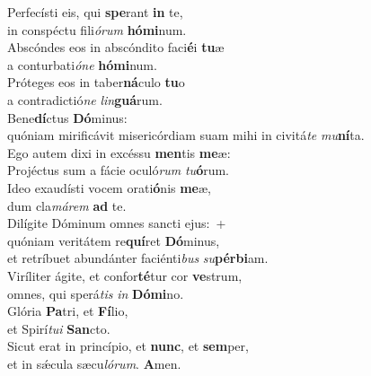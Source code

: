 \evenverse Perfecísti eis, qui \textbf{spe}rant \textbf{in} te,~\*\\
\evenverse in conspéctu fili\textit{ó}\textit{rum} \textbf{hó}\textbf{mi}num.\\
\oddverse Abscóndes eos in abscóndito faci\textbf{é}i \textbf{tu}æ~\*\\
\oddverse a conturbati\textit{ó}\textit{ne} \textbf{hó}\textbf{mi}num.\\
\evenverse Próteges eos in taber\textbf{ná}culo \textbf{tu}o~\*\\
\evenverse a contradictió\textit{ne} \textit{lin}\textbf{guá}rum.\\
\oddverse Bene\textbf{dí}ctus \textbf{Dó}minus:~\*\\
\oddverse quóniam mirificávit misericórdiam suam mihi in civitá\textit{te} \textit{mu}\textbf{ní}ta.\\
\evenverse Ego autem dixi in excéssu \textbf{men}tis \textbf{me}æ:~\*\\
\evenverse Projéctus sum a fácie oculó\textit{rum} \textit{tu}\textbf{ó}rum.\\
\oddverse Ideo exaudísti vocem orati\textbf{ó}nis \textbf{me}æ,~\*\\
\oddverse dum cla\textit{má}\textit{rem} \textbf{ad} te.\\
\evenverse Dilígite Dóminum omnes sancti ejus:~+\\
\evenverse  quóniam veritátem re\textbf{quí}ret \textbf{Dó}minus,~\*\\
\evenverse et retríbuet abundánter faciénti\textit{bus} \textit{su}\textbf{pér}\textbf{bi}am.\\
\oddverse Viríliter ágite, et confor\textbf{té}tur cor \textbf{ve}strum,~\*\\
\oddverse omnes, qui sperá\textit{tis} \textit{in} \textbf{Dó}\textbf{mi}no.\\
\evenverse Glória \textbf{Pa}tri, et \textbf{Fí}lio,~\*\\
\evenverse et Spirí\textit{tu}\textit{i} \textbf{San}cto.\\
\oddverse Sicut erat in princípio, et \textbf{nunc}, et \textbf{sem}per,~\*\\
\oddverse et in sǽcula sæcu\textit{ló}\textit{rum}. \textbf{A}men.\\
